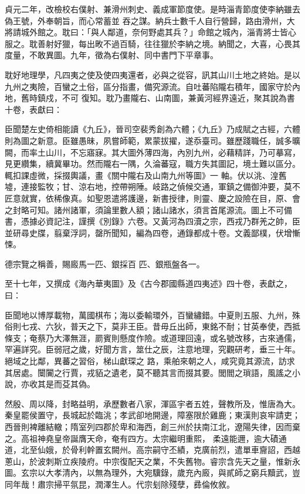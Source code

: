 \begin{pinyinscope}
 貞元二年，改檢校右僕射、兼滑州刺史、義成軍節度使。是時淄青節度使李納雖去偽王號，外奉朝旨，而心常蓄並
 吞之謀。納兵士數千人自行營歸，路由滑州，大將請城外館之。耽曰：「與人鄰道，奈何野處其兵？」命館之城內，淄青將士皆心服之。耽善射好獵，每出畋不過百騎，往往獵於李納之境。納聞之，大喜，心畏其度量，不敢異圖。九年，徵為右僕射、同中書門下平章事。



 耽好地理學，凡四夷之使及使四夷還者，必與之從容，訊其山川土地之終始。是以九州之夷險，百蠻之土俗，區分指畫，備究源流。自吐蕃陷隴右積年，國家守於內地，舊時鎮戍，不可
 復知。耽乃畫隴右、山南圖，兼黃河經界遠近，聚其說為書十卷，表獻曰：



 臣聞楚左史倚相能讀《九丘》，晉司空裴秀創為六體；《九丘》乃成賦之古經，六體則為圖之新意。臣雖愚昧，夙嘗師範，累蒙拔擢，遂忝臺司。雖歷踐職任，誠多曠闕，而率土山川，不忘寤寐。其大圖外薄四海，內別九州，必藉精詳，乃可摹寫，見更纘集，續冀畢功。然而隴右一隅，久淪蕃寇，職方失其圖記，境土難以區分。輒扣課虛微，採掇輿議，畫《關中隴右及山南九州等圖》一
 軸。伏以洮、湟舊墟，連接監牧；甘、涼右地，控帶朔陲。岐路之偵候交通，軍鎮之備御沖要，莫不匠意就實，依稀像真。如聖恩遣將護邊，新書授律，則靈、慶之設險在目，原、會之封略可知。諸州諸軍，須論里數人額；諸山諸水，須言首尾源流。圖上不可備書，憑據必資記注，謹撰《別錄》六卷。又黃河為四瀆之宗，西戎乃群羌之帥，臣並研尋史牒，翦棄浮詞，罄所聞知，編為四卷，通錄都成十卷。文義鄙樸，伏增慚悚。



 德宗覽之稱善，賜廄馬一匹、銀採百
 匹、銀瓶盤各一。



 至十七年，又撰成《海內華夷圖》及《古今郡國縣道四夷述》四十卷，表獻之，曰：



 臣聞地以博厚載物，萬國棋布；海以委輸環外，百蠻繡錯。中夏則五服、九州，殊俗則七戎、六狄，普天之下，莫非王臣。昔毋丘出師，東銘不耐；甘英奉使，西抵條支；奄蔡乃大澤無涯，罽賓則懸度作險。或道理回遠，或名號改移，古來通儒，罕遍詳究。臣弱冠之歲，好聞方言，筮仕之辰，注意地理，究觀研考，垂三十年。絕域之比鄰，異蕃之習俗，梯山獻琛之
 路，乘舶來朝之人，咸究竟其源流，訪求其居處。闤闠之行賈，戎貊之遺老，莫不聽其言而掇其要。閭閻之瑣語，風謠之小說，亦收其是而芟其偽。



 然殷、周以降，封略益明，承歷數者八家，渾區宇者五姓，聲教所及，惟唐為大。秦皇罷侯置守，長城起於臨洮；孝武卻地開邊，障塞限於雞鹿；東漢則哀牢請吏；西晉則裨離結轍；隋室列四郡於卑和海西，創三州於扶南江北，遼陽失律，因而棄之。高祖神堯皇帝誕膺天命，奄有四方。太宗繼明重熙，
 柔遠能邇，逾大磧通道，北至仙娥，於骨利幹置玄闕州。高宗嗣守丕績，克廣前烈，遣單車齎詔，西越蔥山，於波刺斯立疾陵府。中宗復配天之業，不失舊物。睿宗含先天之量，惟新永圖。玄宗以大孝清內，以無為理外，大宛驥錄，歲充內廄，與貳師之窮兵黷武，豈同年哉！肅宗掃平氛昆，潤澤生人。代宗刬除殘孽，彞倫攸敘。




\end{pinyinscope}
